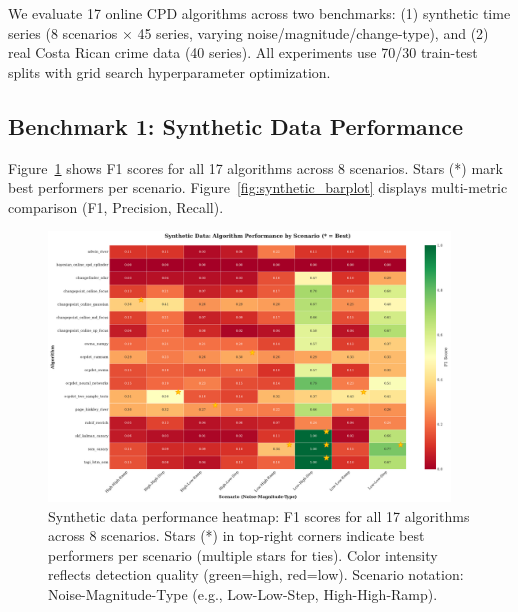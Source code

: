 \documentclass[journal,article,submit,pdftex,moreauthors]{Definitions/mdpi}
\begin{document}
We evaluate 17 online CPD algorithms across two benchmarks: (1) synthetic time series (8 scenarios × 45 series, varying noise/magnitude/change-type), and (2) real Costa Rican crime data (40 series). All experiments use 70/30 train-test splits with grid search hyperparameter optimization.

\subsection{Benchmark 1: Synthetic Data Performance}
\label{sec:results_synthetic}

Figure~\ref{fig:synthetic_heatmap} shows F1 scores for all 17 algorithms across 8 scenarios. Stars (*) mark best performers per scenario. Figure~\ref{fig:synthetic_barplot} displays multi-metric comparison (F1, Precision, Recall).

\begin{figure}[H]
\centering
\includegraphics[width=0.95\textwidth]{figures/fig_synthetic_heatmap.pdf}
\caption{Synthetic data performance heatmap: F1 scores for all 17 algorithms across 8 scenarios. Stars (*) in top-right corners indicate best performers per scenario (multiple stars for ties). Color intensity reflects detection quality (green=high, red=low). Scenario notation: Noise-Magnitude-Type (e.g., Low-Low-Step, High-High-Ramp).}
\label{fig:synthetic_heatmap}
\end{figure}
\end{document}
